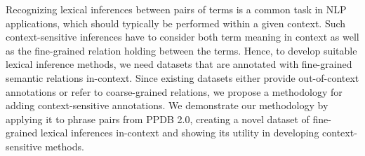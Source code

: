 Recognizing lexical inferences between pairs of terms is a common task in NLP applications, which should typically be performed within a given context. Such context-sensitive inferences have to consider both term meaning in context as well as the fine-grained relation holding between the terms. Hence, to develop suitable lexical inference methods, we need datasets that are annotated with fine-grained semantic relations in-context. Since existing datasets either provide out-of-context annotations or refer to coarse-grained relations, we propose a methodology for adding context-sensitive annotations. We demonstrate our methodology by applying it to phrase pairs from PPDB 2.0, creating a novel dataset of fine-grained lexical inferences in-context and showing its utility in developing context-sensitive methods.
